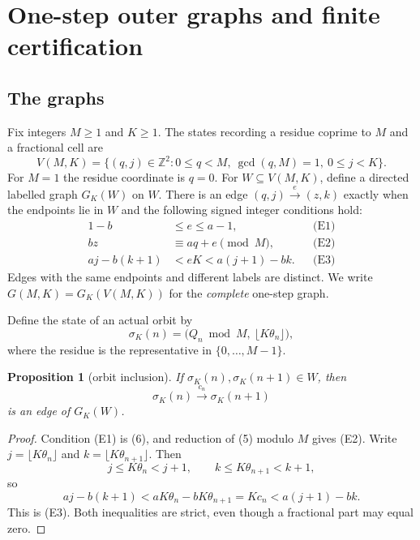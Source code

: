 \documentclass[11pt,reqno]{amsart}
\newtheorem{proposition}[theorem]{Proposition}
\theoremstyle{definition}
\theoremstyle{remark}
\begin{document}
\section{One-step outer graphs and finite certification}\label{sec:3}

\subsection{The graphs}\label{sec:3.1}

Fix integers \(M\ge1\) and \(K\ge1\). The states recording a residue
coprime to \(M\) and a fractional cell are
\[
V(M,K)=\{(q,j)\in\mathbb Z^2:0\le q<M,\ \gcd(q,M)=1,\ 0\le j<K\}.
\tag{9}\label{eq:9}
\]
For \(M=1\) the residue coordinate is \(q=0\). For
\(W\subseteq V(M,K)\), define a directed labelled graph \(G_K(W)\)
on \(W\). There is an edge \((q,j)\xrightarrow{e}(z,k)\) exactly when
the endpoints lie in \(W\) and the following signed integer conditions hold:
\[
\begin{aligned}
1-b&\le e\le a-1, &&\text{(E1)}\\
bz&\equiv aq+e\pmod M, &&\text{(E2)}\\
aj-b(k+1)&<eK<a(j+1)-bk. &&\text{(E3)}
\end{aligned}
\tag{10}\label{eq:10}
\]
Edges with the same endpoints and different labels are distinct. We
write \(G(M,K)=G_K(V(M,K))\) for the \emph{complete} one-step graph.

Define the state of an actual orbit by
\[
\sigma_K(n)=\bigl(Q_n\bmod M,\ \lfloor K\theta_n\rfloor\bigr),
\tag{11}\label{eq:11}
\]
where the residue is the representative in \(\{0,\ldots,M-1\}\).

\begin{samepage}
\begin{proposition}[orbit inclusion]\leavevmode\label{thm:5}
If
\(\sigma_K(n),\sigma_K(n+1)\in W\), then
\[
\sigma_K(n)\xrightarrow{c_n}\sigma_K(n+1)
\]
is an edge of \(G_K(W)\).
\label{thm-end:5}
\end{proposition}
\end{samepage}

\begin{proof}\leavevmode\label{proof:5}
Condition (E1) is (6), and reduction of (5) modulo \(M\)
gives (E2). Write \(j=\lfloor K\theta_n\rfloor\) and
\(k=\lfloor K\theta_{n+1}\rfloor\). Then
\[
j\le K\theta_n<j+1,\qquad k\le K\theta_{n+1}<k+1,
\]
so
\[
aj-b(k+1)<aK\theta_n-bK\theta_{n+1}=Kc_n<a(j+1)-bk.
\]
This is (E3). Both inequalities are strict, even though a fractional part
may equal zero. \qedhere
\end{proof}
\end{document}
